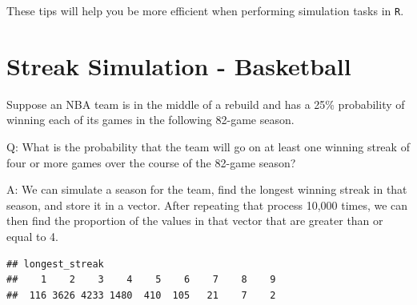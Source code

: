 \documentclass[
  11pt,
]{book}
\newenvironment{Shaded}{\begin{snugshade}}{\end{snugshade}}
\newcommand{\AttributeTok}[1]{\textcolor[rgb]{0.77,0.63,0.00}{#1}}
\newcommand{\CommentTok}[1]{\textcolor[rgb]{0.56,0.35,0.01}{\textit{#1}}}
\newcommand{\ConstantTok}[1]{\textcolor[rgb]{0.00,0.00,0.00}{#1}}
\newcommand{\ControlFlowTok}[1]{\textcolor[rgb]{0.13,0.29,0.53}{\textbf{#1}}}
\newcommand{\DecValTok}[1]{\textcolor[rgb]{0.00,0.00,0.81}{#1}}
\newcommand{\FloatTok}[1]{\textcolor[rgb]{0.00,0.00,0.81}{#1}}
\newcommand{\FunctionTok}[1]{\textcolor[rgb]{0.00,0.00,0.00}{#1}}
\newcommand{\NormalTok}[1]{#1}
\newcommand{\OtherTok}[1]{\textcolor[rgb]{0.56,0.35,0.01}{#1}}
\newcommand{\SpecialCharTok}[1]{\textcolor[rgb]{0.00,0.00,0.00}{#1}}
\theoremstyle{definition}
\theoremstyle{definition}
\theoremstyle{definition}
\theoremstyle{definition}
\theoremstyle{remark}
\begin{document}
These tips will help you be more efficient when performing simulation tasks in \texttt{R}.

\hypertarget{streak-simulation---basketball}{%
\section{Streak Simulation - Basketball}\label{streak-simulation---basketball}}

Suppose an NBA team is in the middle of a rebuild and has a 25\% probability of winning each of its games in the following 82-game season.

Q: What is the probability that the team will go on at least one winning streak of four or more games over the course of the 82-game season?

A: We can simulate a season for the team, find the longest winning streak in that season, and store it in a vector. After repeating that process 10,000 times, we can then find the proportion of the values in that vector that are greater than or equal to 4.

\begin{Shaded}
\end{Shaded}

\begin{verbatim}
## longest_streak
##    1    2    3    4    5    6    7    8    9 
##  116 3626 4233 1480  410  105   21    7    2
\end{verbatim}
\end{document}
